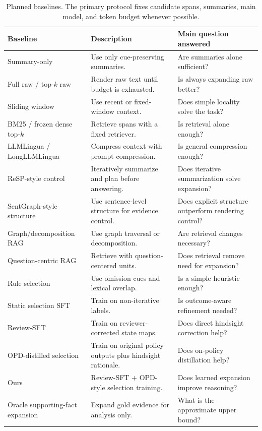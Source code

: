 \documentclass[11pt]{article}
\begin{document}
\begin{table}[t]
\centering
\small
\begin{tabular}{lll}
\toprule
Baseline & Description & Main question answered \\
\midrule
Summary-only & Use only cue-preserving summaries. & Are summaries alone sufficient? \\
Full raw / top-$k$ raw & Render raw text until budget is exhausted. & Is always expanding raw better? \\
Sliding window & Use recent or fixed-window context. & Does simple locality solve the task? \\
BM25 / frozen dense top-$k$ & Retrieve spans with a fixed retriever. & Is retrieval alone enough? \\
LLMLingua / LongLLMLingua & Compress context with prompt compression. & Is general compression enough? \\
ReSP-style control & Iteratively summarize and plan before answering. & Does iterative summarization solve expansion? \\
SentGraph-style structure & Use sentence-level structure for evidence control. & Does explicit structure outperform rendering control? \\
Graph/decomposition RAG & Use graph traversal or decomposition. & Are retrieval changes necessary? \\
Question-centric RAG & Retrieve with question-centered units. & Does retrieval remove need for expansion? \\
Rule selection & Use omission cues and lexical overlap. & Is a simple heuristic enough? \\
Static selection SFT & Train on non-iterative labels. & Is outcome-aware refinement needed? \\
Review-SFT & Train on reviewer-corrected state maps. & Does direct hindsight correction help? \\
OPD-distilled selection & Train on original policy outputs plus hindsight rationale. & Does on-policy distillation help? \\
Ours & Review-SFT + OPD-style selection training. & Does learned expansion improve reasoning? \\
Oracle supporting-fact expansion & Expand gold evidence for analysis only. & What is the approximate upper bound? \\
\bottomrule
\end{tabular}
\caption{Planned baselines. The primary protocol fixes candidate spans, summaries, main model, and token budget whenever possible.}
\label{tab:baselines}
\end{table}
\end{document}
